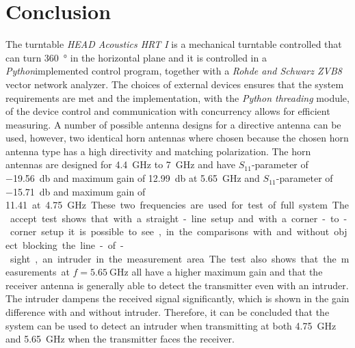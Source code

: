 \chapter{Conclusion}
The turntable \textit{HEAD Acoustics HRT I} is a mechanical turntable controlled that can turn \SI{360}{\degree} in the horizontal plane and it is controlled in a \textit{Python}implemented control program, together with a \textit{Rohde and Schwarz ZVB8} vector network analyzer. The choices of external devices ensures that the system requirements are met and the implementation, with the \textit{Python threading} module, of the device control and communication with concurrency allows for efficient measuring. A number of possible antenna designs for a directive antenna can be used, however, two identical horn antennas where chosen because the chosen horn antenna type has a high directivity and matching polarization. The horn antennas are designed for \SI{4.4}{\giga\hertz} to \SI{7}{\giga\hertz} and have $S_{11}$-parameter of \SI{-19.56}{\decibel} and maximum gain of \SI{12.99}{\decibel} at \SI{5.65}{\giga\hertz} and $S_{11}$-parameter of \SI{-15.71}{\decibel} and maximum gain of \SI{11.41} at \SI{4.75}{\giga\hertz}. These two frequencies are used for test of full system. 

The accept test shows that with a straight-line setup and with a corner-to-corner setup it is possible to see, in the comparisons with and without object blocking the line-of-sight, an intruder in the measurement area. The test also shows that the measurements at $f=\SI{5.65}{\giga\hertz}$ all have a higher maximum gain and that the receiver antenna is generally able to detect the transmitter even with an intruder. The intruder dampens the received signal significantly, which is shown in the gain difference with and without intruder. Therefore, it can be concluded that the system can be used to detect an intruder when transmitting at both \SI{4.75}{\giga\hertz} and \SI{5.65}{\giga\hertz} when the transmitter faces the receiver. 